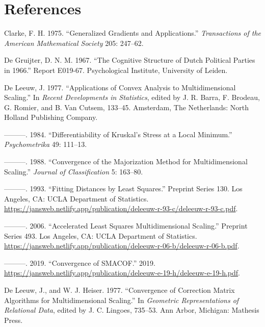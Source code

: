 \documentclass[
  12pt,
]{article}
\newlength{\cslhangindent}
\newenvironment{CSLReferences}[2] %
 {\begin{list}{}{%
  \setlength{\itemindent}{0pt}
  \setlength{\leftmargin}{0pt}
  \setlength{\parsep}{0pt}
  \ifodd #1
   \setlength{\leftmargin}{\cslhangindent}
   \setlength{\itemindent}{-1\cslhangindent}
  \fi
  \setlength{\itemsep}{#2\baselineskip}}}
 {\end{list}}
\begin{document}
\section*{References}\label{references}

\label{refs}
\begin{CSLReferences}{1}{0}
Clarke, F. H. 1975. {``Generalized Gradients and Applications.''} \emph{Transactions of the American Mathematical Society} 205: 247--62.

De Gruijter, D. N. M. 1967. {``{The Cognitive Structure of Dutch Political Parties in 1966}.''} Report E019-67. Psychological Institute, University of Leiden.

De Leeuw, J. 1977. {``Applications of Convex Analysis to Multidimensional Scaling.''} In \emph{Recent Developments in Statistics}, edited by J. R. Barra, F. Brodeau, G. Romier, and B. Van Cutsem, 133--45. Amsterdam, The Netherlands: North Holland Publishing Company.

---------. 1984. {``{Differentiability of Kruskal's Stress at a Local Minimum}.''} \emph{Psychometrika} 49: 111--13.

---------. 1988. {``Convergence of the Majorization Method for Multidimensional Scaling.''} \emph{Journal of Classification} 5: 163--80.

---------. 1993. {``Fitting Distances by Least Squares.''} Preprint Series 130. Los Angeles, CA: UCLA Department of Statistics. \url{https://jansweb.netlify.app/publication/deleeuw-r-93-c/deleeuw-r-93-c.pdf}.

---------. 2006. {``{Accelerated Least Squares Multidimensional Scaling}.''} Preprint Series 493. Los Angeles, CA: UCLA Department of Statistics. \url{https://jansweb.netlify.app/publication/deleeuw-r-06-b/deleeuw-r-06-b.pdf}.

---------. 2019. {``{Convergence of SMACOF}.''} 2019. \url{https://jansweb.netlify.app/publication/deleeuw-e-19-h/deleeuw-e-19-h.pdf}.

De Leeuw, J., and W. J. Heiser. 1977. {``Convergence of Correction Matrix Algorithms for Multidimensional Scaling.''} In \emph{Geometric Representations of Relational Data}, edited by J. C. Lingoes, 735--53. Ann Arbor, Michigan: Mathesis Press.


\end{CSLReferences}
\end{document}
